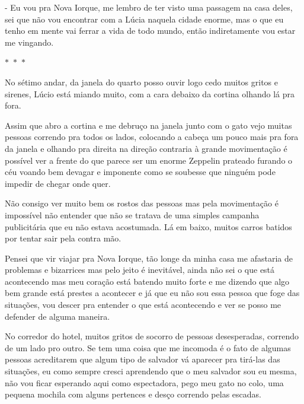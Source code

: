 - Eu vou pra Nova Iorque, me lembro de ter visto uma passagem na casa deles, sei que não vou encontrar com a Lúcia naquela cidade enorme, mas o que eu tenho em mente vai ferrar a vida de todo mundo, então indiretamente vou estar me vingando.

\begin{center}
	$\ast$~$\ast$~$\ast$
\end{center}

No sétimo andar, da janela do quarto posso ouvir logo cedo muitos gritos e sirenes, Lúcio está miando muito, com a cara debaixo da cortina olhando lá pra fora.

Assim que abro a cortina e me debruço na janela junto com o gato vejo muitas pessoas correndo pra todos os lados, colocando a cabeça um pouco mais pra fora da janela e olhando pra direita na direção contraria à grande movimentação é possível ver a frente do que parece ser um enorme Zeppelin prateado furando o céu voando bem devagar e imponente como se soubesse que ninguém pode impedir de chegar onde quer.

Não consigo ver muito bem os rostos das pessoas mas pela movimentação é impossível não entender que não se tratava de uma simples campanha publicitária que eu não estava acostumada. Lá em baixo, muitos carros batidos por tentar sair pela contra mão. 

Pensei que vir viajar pra Nova Iorque, tão longe da minha casa me afastaria de problemas e bizarrices mas pelo jeito é inevitável, ainda não sei o que está acontecendo mas meu coração está batendo muito forte e me dizendo que algo bem grande está prestes a acontecer e já que eu não sou essa pessoa que foge das situações, vou descer pra entender o que está acontecendo e ver se posso me defender de alguma maneira.

No corredor do hotel, muitos gritos de socorro de pessoas desesperadas, correndo de um lado pro outro. Se tem uma coisa que me incomoda é o fato de algumas pessoas acreditarem que algum tipo de salvador vá aparecer pra tirá-las das situações, eu como sempre cresci aprendendo que o meu salvador sou eu mesma, não vou ficar esperando aqui como espectadora, pego meu gato no colo, uma pequena mochila com alguns pertences e desço correndo pelas escadas.




